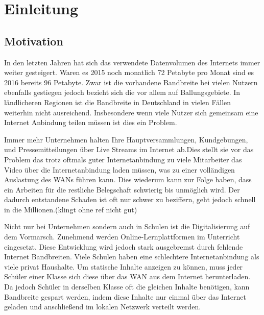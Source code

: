 \chapter{Einleitung}\label{ch:introduction}


%

\section{Motivation}
In den letzten Jahren hat sich das verwendete Datenvolumen des Internets immer weiter gesteigert. Waren es 2015 noch monatlich 72 Petabyte pro Monat sind es 2016 bereits 96 Petabyte. Zwar ist die vorhandene Bandbreite bei vielen Nutzern ebenfalls gestiegen jedoch bezieht sich die vor allem auf Ballungsgebiete. In ländlicheren Regionen ist die Bandbreite in Deutschland in vielen Fällen weiterhin nicht ausreichend. Insbesondere wenn viele Nutzer sich gemeinsam eine Internet Anbindung teilen müssen ist dies ein Problem.\study

Immer mehr Unternehmen halten Ihre Hauptversammlungen, Kundgebungen, und Pressemitteilungen über Live Streams im Internet ab.\study Dies stellt sie vor das Problem das trotz oftmals guter Internetanbindung zu viele Mitarbeiter das Video über die Internetanbindung laden müssen, was zu einer volländigen Auslastung des WANs führen kann. Dies wiederum kann zur Folge haben, dass ein Arbeiten für die restliche Belegschaft schwierig bis unmöglich wird. Der dadurch entstandene Schaden ist oft nur schwer zu beziffern, geht jedoch schnell in die Millionen.(klingt ohne ref nicht gut)\study

Nicht nur bei Unternehmen sondern auch in Schulen ist die Digitalisierung auf dem Vormarsch. Zunehmend werden Online-Lernplattformen im Unterricht eingesetzt. Diese Entwicklung wird jedoch stark ausgebremst durch fehlende Internet Bandbreiten. Viele Schulen haben eine schlechtere Internetanbindung als viele privat Haushalte. Um statische Inhalte anzeigen zu können, muss jeder Schüler einer Klasse sich diese über das WAN aus dem Internet herunterladen. Da jedoch Schüler in derselben Klasse oft die gleichen Inhalte benötigen, kann Bandbreite gespart werden, indem diese Inhalte nur einmal über das Internet geladen und anschließend im lokalen Netzwerk verteilt werden.

